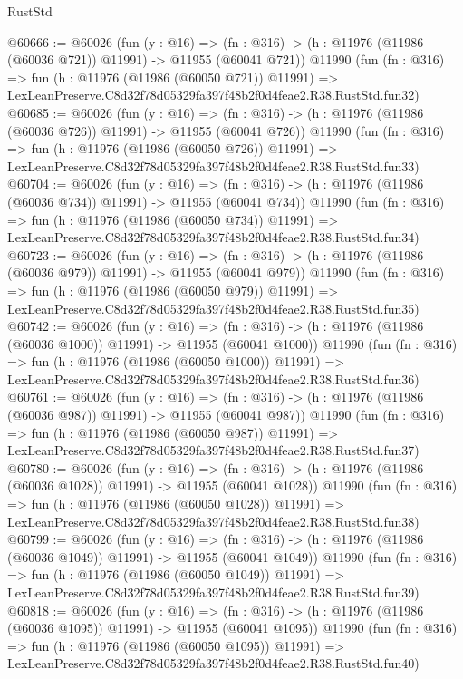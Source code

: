 \begin{lexlean}{RustStd}
\begin{coremodule}
@60666 := @60026
    (fun (y : @16) =>
    (fn : @316) -> (h : @11976 (@11986 (@60036 @721)) @11991) -> @11955 (@60041 @721))
    @11990
    (fun (fn : @316) =>
    fun (h : @11976 (@11986 (@60050 @721)) @11991) =>
    LexLeanPreserve.C8d32f78d05329fa397f48b2f0d4feae2.R38.RustStd.fun32)
@60685 := @60026
    (fun (y : @16) =>
    (fn : @316) -> (h : @11976 (@11986 (@60036 @726)) @11991) -> @11955 (@60041 @726))
    @11990
    (fun (fn : @316) =>
    fun (h : @11976 (@11986 (@60050 @726)) @11991) =>
    LexLeanPreserve.C8d32f78d05329fa397f48b2f0d4feae2.R38.RustStd.fun33)
@60704 := @60026
    (fun (y : @16) =>
    (fn : @316) -> (h : @11976 (@11986 (@60036 @734)) @11991) -> @11955 (@60041 @734))
    @11990
    (fun (fn : @316) =>
    fun (h : @11976 (@11986 (@60050 @734)) @11991) =>
    LexLeanPreserve.C8d32f78d05329fa397f48b2f0d4feae2.R38.RustStd.fun34)
@60723 := @60026
    (fun (y : @16) =>
    (fn : @316) -> (h : @11976 (@11986 (@60036 @979)) @11991) -> @11955 (@60041 @979))
    @11990
    (fun (fn : @316) =>
    fun (h : @11976 (@11986 (@60050 @979)) @11991) =>
    LexLeanPreserve.C8d32f78d05329fa397f48b2f0d4feae2.R38.RustStd.fun35)
@60742 := @60026
    (fun (y : @16) =>
    (fn : @316) -> (h : @11976 (@11986 (@60036 @1000)) @11991) -> @11955 (@60041 @1000))
    @11990
    (fun (fn : @316) =>
    fun (h : @11976 (@11986 (@60050 @1000)) @11991) =>
    LexLeanPreserve.C8d32f78d05329fa397f48b2f0d4feae2.R38.RustStd.fun36)
@60761 := @60026
    (fun (y : @16) =>
    (fn : @316) -> (h : @11976 (@11986 (@60036 @987)) @11991) -> @11955 (@60041 @987))
    @11990
    (fun (fn : @316) =>
    fun (h : @11976 (@11986 (@60050 @987)) @11991) =>
    LexLeanPreserve.C8d32f78d05329fa397f48b2f0d4feae2.R38.RustStd.fun37)
@60780 := @60026
    (fun (y : @16) =>
    (fn : @316) -> (h : @11976 (@11986 (@60036 @1028)) @11991) -> @11955 (@60041 @1028))
    @11990
    (fun (fn : @316) =>
    fun (h : @11976 (@11986 (@60050 @1028)) @11991) =>
    LexLeanPreserve.C8d32f78d05329fa397f48b2f0d4feae2.R38.RustStd.fun38)
@60799 := @60026
    (fun (y : @16) =>
    (fn : @316) -> (h : @11976 (@11986 (@60036 @1049)) @11991) -> @11955 (@60041 @1049))
    @11990
    (fun (fn : @316) =>
    fun (h : @11976 (@11986 (@60050 @1049)) @11991) =>
    LexLeanPreserve.C8d32f78d05329fa397f48b2f0d4feae2.R38.RustStd.fun39)
@60818 := @60026
    (fun (y : @16) =>
    (fn : @316) -> (h : @11976 (@11986 (@60036 @1095)) @11991) -> @11955 (@60041 @1095))
    @11990
    (fun (fn : @316) =>
    fun (h : @11976 (@11986 (@60050 @1095)) @11991) =>
    LexLeanPreserve.C8d32f78d05329fa397f48b2f0d4feae2.R38.RustStd.fun40)

\end{coremodule}
\end{lexlean}
